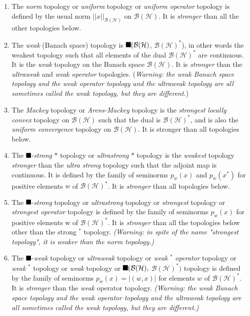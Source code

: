 \documentclass[aps,preprint]{revtex4}%
\providecommand{\U}[1]{\protect\rule{.1in}{.1in}}
\begin{document}
\begin{enumerate}
\item The \emph{norm} topology or \emph{uniform} topology or \emph{uniform
operator} topology is defined by the usual norm $||x||_{\mathcal{B}%
(\mathcal{H})}$ on $\mathcal{B}(\mathcal{H})$. It is \emph{stronger} than all
the other topologies below.

\item The \emph{weak} (Banach space) topology is $\U{3c3} (\mathcal{B}%
(\mathcal{H})$, $\mathcal{B}(\mathcal{H})^{\ast}$), in other words the weakest
topology such that all elements of the dual $\mathcal{B}(\mathcal{H})^{\ast}$
are continuous. It is the \emph{weak} topology on the Banach space
$\mathcal{B}(\mathcal{H})$. It is \emph{stronger} than the \emph{ultraweak}
and \emph{weak operator} topologies. (\emph{Warning: the weak Banach space
topology and the weak operator topology and the ultraweak topology are all
sometimes called the weak topology, but they are different.})

\item The \emph{Mackey} topology or \emph{Arens-Mackey} topology is the
\emph{strongest locally convex} topology on $\mathcal{B}(\mathcal{H})$ such
that the dual is $\mathcal{B}(\mathcal{H})^{\ast}$, and is also the
\emph{uniform convergence} topology on $\mathcal{B}(\mathcal{H})$. It is
stronger than all topologies below.

\item The $\U{3c3} $-\emph{strong} $\ast$ topology or \emph{ultrastrong}
$\ast$ topology is the \emph{weakest} topology \emph{stronger} than the
\emph{ultra strong} topology such that the adjoint map is continuous. It is
defined by the family of seminorms $p_{w}(x)$ and $p_{w}(x^{\ast})$ for
positive elements $w$ of $\mathcal{B}(\mathcal{H})^{\ast}$. It is
\emph{stronger} than all topologies below.

\item The $\U{3c3} $-\emph{strong }topology or \emph{ultrastrong} topology or
\emph{strongest} topology or \emph{strongest operator }topology is defined by
the family of seminorms $p_{w}(x)$ for positive elements w of $\mathcal{B}%
(\mathcal{H})^{\ast}$. It is \emph{stronger} than all the topologies below
other than the strong $^{\ast}$ topology. \emph{(Warning: in spite of the name
"strongest topology", it is weaker than the norm topology.)}

\item The $\U{3c3} $-\emph{weak} topology or \emph{ultraweak} topology or
\emph{weak }$^{\ast}$\emph{ operator} topology or \emph{weak} $^{\ast}$
topology or \emph{weak} topology or $\U{3c3} (\mathcal{B}(\mathcal{H}),$
$\mathcal{B}(\mathcal{H})^{\ast})$ topology is defined by the family of
seminorms $p_{w}\left(  x\right)  =|(w,x)|$ for elements $w$ of $\mathcal{B}%
(\mathcal{H})^{\ast}$. It is \emph{stronger} than the \emph{weak} operator
topology. \emph{(Warning: the weak Banach space topology and the weak operator
topology and the ultraweak topology are all sometimes called the weak
topology, but they are different.)}


\end{enumerate}
\end{document}
